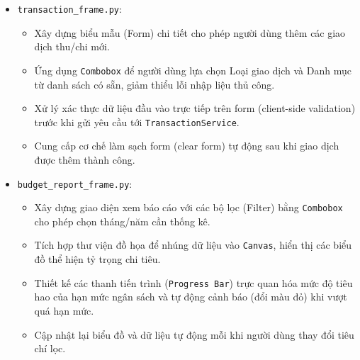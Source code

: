 \documentclass[12pt,letterpaper]{article}
\begin{document}
\begin{itemize}
\begin{itemize}
\begin{itemize}
        \end{itemize}
        \item \texttt{transaction\_frame.py}:
        \begin{itemize}
            \item Xây dựng biểu mẫu (Form) chi tiết cho phép người dùng thêm các giao dịch thu/chi mới.
            \item Ứng dụng \texttt{Combobox} để người dùng lựa chọn Loại giao dịch và Danh mục từ danh sách có sẵn, giảm thiểu lỗi nhập liệu thủ công.
            \item Xử lý xác thực dữ liệu đầu vào trực tiếp trên form (client-side validation) trước khi gửi yêu cầu tới \texttt{TransactionService}.
            \item Cung cấp cơ chế làm sạch form (clear form) tự động sau khi giao dịch được thêm thành công.
        \end{itemize}
        \item \texttt{budget\_report\_frame.py}:
        \begin{itemize}
            \item Xây dựng giao diện xem báo cáo với các bộ lọc (Filter) bằng \texttt{Combobox} cho phép chọn tháng/năm cần thống kê.
            \item Tích hợp thư viện đồ họa để nhúng dữ liệu vào \texttt{Canvas}, hiển thị các biểu đồ thể hiện tỷ trọng chi tiêu.
            \item Thiết kế các thanh tiến trình (\texttt{Progress Bar}) trực quan hóa mức độ tiêu hao của hạn mức ngân sách và tự động cảnh báo (đổi màu đỏ) khi vượt quá hạn mức.
            \item Cập nhật lại biểu đồ và dữ liệu tự động mỗi khi người dùng thay đổi tiêu chí lọc.
        \end{itemize}
    \end{itemize}
\end{itemize}
\end{document}
